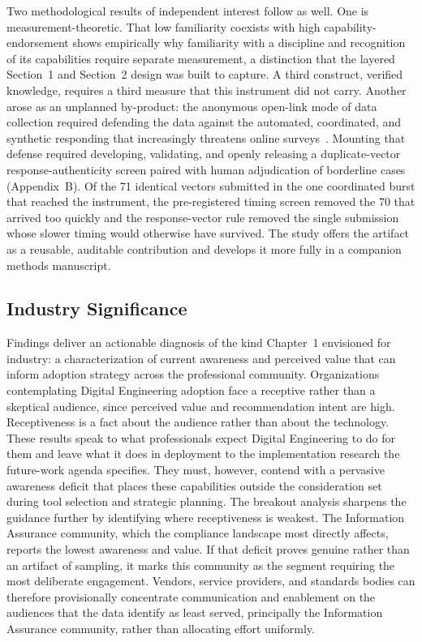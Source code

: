 Two methodological results of independent interest follow as well. One is measurement-theoretic. That low familiarity coexists with high capability-endorsement shows empirically why familiarity with a discipline and recognition of its capabilities require separate measurement, a distinction that the layered Section~1 and Section~2 design was built to capture. A third construct, verified knowledge, requires a third measure that this instrument did not carry. Another arose as an unplanned by-product: the anonymous open-link mode of data collection required defending the data against the automated, coordinated, and synthetic responding that increasingly threatens online surveys~\parencite{Pozzar_Bots_2020, Westwood_LLM_2025, Jaffe_NotBots_2026}. Mounting that defense required developing, validating, and openly releasing a duplicate-vector response-authenticity screen paired with human adjudication of borderline cases (Appendix~B). Of the 71 identical vectors submitted in the one coordinated burst that reached the instrument, the pre-registered timing screen removed the 70 that arrived too quickly and the response-vector rule removed the single submission whose slower timing would otherwise have survived. The study offers the artifact as a reusable, auditable contribution and develops it more fully in a companion methods manuscript.

\subsection{Industry Significance}

Findings deliver an actionable diagnosis of the kind Chapter~1 envisioned for industry: a characterization of current awareness and perceived value that can inform adoption strategy across the professional community. Organizations contemplating Digital Engineering adoption face a receptive rather than a skeptical audience, since perceived value and recommendation intent are high. Receptiveness is a fact about the audience rather than about the technology. These results speak to what professionals expect Digital Engineering to do for them and leave what it does in deployment to the implementation research the future-work agenda specifies. They must, however, contend with a pervasive awareness deficit that places these capabilities outside the consideration set during tool selection and strategic planning. The breakout analysis sharpens the guidance further by identifying where receptiveness is weakest. The Information Assurance community, which the compliance landscape most directly affects, reports the lowest awareness and value. If that deficit proves genuine rather than an artifact of sampling, it marks this community as the segment requiring the most deliberate engagement. Vendors, service providers, and standards bodies can therefore provisionally concentrate communication and enablement on the audiences that the data identify as least served, principally the Information Assurance community, rather than allocating effort uniformly.

